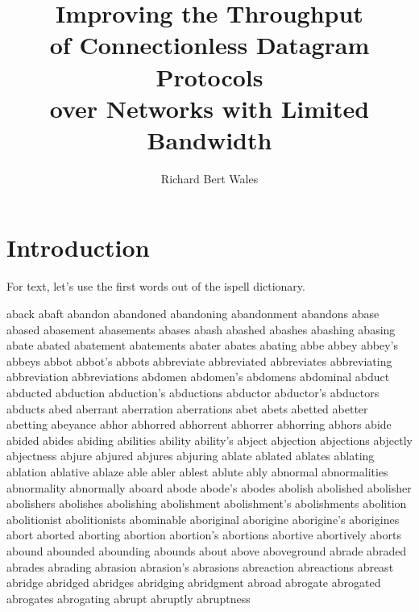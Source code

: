 \documentclass [PhD] {uclathes}
\title          {Improving the Throughput \\
                of Connectionless Datagram Protocols \\
                over Networks with Limited Bandwidth}
\author         {Richard Bert Wales}
\begin{document}
\makeintropages

%
%

\chapter{Introduction}

For text, let's use the first words out of the ispell dictionary.

aback
abaft
abandon
abandoned
abandoning
abandonment
abandons
abase
abased
abasement
abasements
abases
abash
abashed
abashes
abashing
abasing
abate
abated
abatement
abatements
abater
abates
abating
abbe
abbey
abbey's
abbeys
abbot
abbot's
abbots
abbreviate
abbreviated
abbreviates
abbreviating
abbreviation
abbreviations
abdomen
abdomen's
abdomens
abdominal
abduct
abducted
abduction
abduction's
abductions
abductor
abductor's
abductors
abducts
abed
aberrant
aberration
aberrations
abet
abets
abetted
abetter
abetting
abeyance
abhor
abhorred
abhorrent
abhorrer
abhorring
abhors
abide
abided
abides
abiding
abilities
ability
ability's
abject
abjection
abjections
abjectly
abjectness
abjure
abjured
abjures
abjuring
ablate
ablated
ablates
ablating
ablation
ablative
ablaze
able
abler
ablest
ablute
ably
abnormal
abnormalities
abnormality
abnormally
aboard
abode
abode's
abodes
abolish
abolished
abolisher
abolishers
abolishes
abolishing
abolishment
abolishment's
abolishments
abolition
abolitionist
abolitionists
abominable
aboriginal
aborigine
aborigine's
aborigines
abort
aborted
aborting
abortion
abortion's
abortions
abortive
abortively
aborts
abound
abounded
abounding
abounds
about
above
aboveground
abrade
abraded
abrades
abrading
abrasion
abrasion's
abrasions
abreaction
abreactions
abreast
abridge
abridged
abridges
abridging
abridgment
abroad
abrogate
abrogated
abrogates
abrogating
abrupt
abruptly
abruptness


\end{document}
